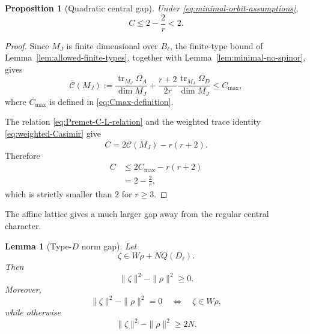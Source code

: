 \documentclass[11pt]{amsart}
\newtheorem{proposition}[theorem]{Proposition}
\newtheorem{lemma}[theorem]{Lemma}
\theoremstyle{remark}
\numberwithin{equation}{section}
\begin{document}
\begin{proposition}[Quadratic central gap]
\label{prop:minimal-Casimir-gap}
Under \eqref{eq:minimal-orbit-assumptions},
\begin{equation}
   C\le 2-\frac2r<2.
\end{equation}
\end{proposition}

\begin{proof}
Since \(M_J\) is finite dimensional over \(B_\ell\), the finite-type
bound of Lemma~\ref{lem:allowed-finite-types}, together with
Lemma~\ref{lem:minimal-no-spinor}, gives
\[
   \overline{\mathcal C}(M_J)
   :=
   \frac{\operatorname{tr}_{M_J}\Omega_A}{\dim M_J}
   +
   \frac{r+2}{2r}
   \frac{\operatorname{tr}_{M_J}\Omega_D}{\dim M_J}
   \le C_{\max},
\]
where \(C_{\max}\) is defined in \eqref{eq:Cmax-definition}.

The relation \eqref{eq:Premet-C-L-relation} and the weighted trace identity
\eqref{eq:weighted-Casimir} give
\[
   C
   =
   2\overline{\mathcal C}(M_J)-r(r+2).
\]
Therefore
\[
\begin{aligned}
   C
   &\le
   2C_{\max}-r(r+2)\\
   &=
   2-\frac2r,
\end{aligned}
\]
which is strictly smaller than \(2\) for \(r\ge3\).
\end{proof}

The affine lattice gives a much larger gap away from the regular central
character.

\begin{lemma}[Type-\(D\) norm gap]
\label{lem:D-norm-gap}
Let
\[
   \zeta\in W\rho+NQ(D_\ell).
\]
Then
\[
   \|\zeta\|^2-\|\rho\|^2\ge0.
\]
Moreover,
\[
   \|\zeta\|^2-\|\rho\|^2=0
   \quad\Longleftrightarrow\quad
   \zeta\in W\rho,
\]
while otherwise
\begin{equation}
\label{eq:D-norm-positive-gap}
   \|\zeta\|^2-\|\rho\|^2
   \ge2N.
\end{equation}
\end{lemma}
\end{document}
